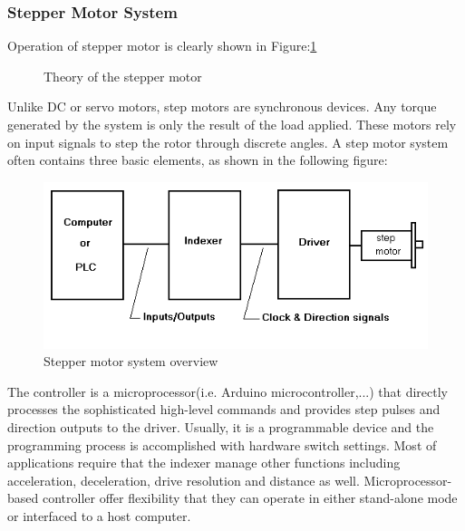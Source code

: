 \subsubsection{Stepper Motor System}
Operation of stepper motor is clearly shown in Figure:\ref{fig:theory_of_the_stepper_motor}
\begin{figure}[H]
    \centering
    \qquad
    \caption{Theory of the stepper motor}%
    \label{fig:theory_of_the_stepper_motor}%
\end{figure}
Unlike DC or servo motors, step motors are synchronous devices. Any torque generated by the system is only the result of the load applied. These motors rely on input signals to step the rotor through discrete angles. A step motor system often contains three basic elements, as shown in the following figure:
\begin{figure}[H]
	\centering
	\includegraphics[width=\maxwidth{15cm}, keepaspectratio]{Chapters/Fig/stepper_motor_system.png}
	\caption{Stepper motor system overview}
	\label{fig:stepper_motor_system}
\end{figure}
The controller is a microprocessor(i.e. Arduino microcontroller,...) that directly processes the sophisticated high-level commands and provides step pulses and direction outputs to the driver. Usually, it is a programmable device and the programming process is accomplished with hardware switch settings. Most of applications require that the indexer manage other functions including acceleration, deceleration, drive resolution and distance as well. Microprocessor-based controller offer flexibility that they can operate in either stand-alone mode or interfaced to a host computer.

